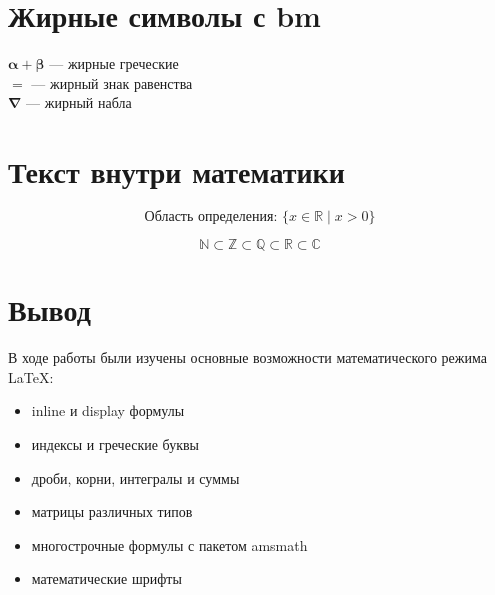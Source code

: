 \documentclass[a4paper,12pt]{article}
\begin{document}
\section{Жирные символы с bm}

$\bm{\alpha} + \bm{\beta}$ — жирные греческие \\
$\bm{=}$ — жирный знак равенства \\
$\bm{\nabla}$ — жирный набла

\section{Текст внутри математики}

\[
\text{Область определения: } \{x \in \mathbb{R} \mid x > 0\}
\]

\[
\mathbb{N} \subset \mathbb{Z} \subset \mathbb{Q} \subset \mathbb{R} \subset \mathbb{C}
\]

\section{Вывод}

В ходе работы были изучены основные возможности математического режима LaTeX:
\begin{itemize}
  \item inline и display формулы
  \item индексы и греческие буквы
  \item дроби, корни, интегралы и суммы
  \item матрицы различных типов
  \item многострочные формулы с пакетом amsmath
  \item математические шрифты
\end{itemize}
\end{document}
